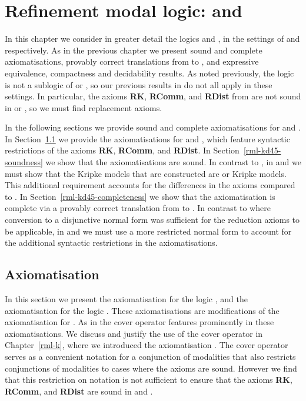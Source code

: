 \chapter{Refinement modal logic: \classKFF{} and \classKD{}}\label{rml-kd45}

In this chapter we consider in greater detail the logics \logicRmlKFF{} and \logicRmlKD{}, in the settings of \classKFF{} and \classKD{} respectively.
As in the previous chapter we present sound and complete axiomatisations, provably correct translations from \langRml{} to \langMl{}, and expressive equivalence, compactness and decidability results.
As noted previously, the logic \logicRmlK{} is not a sublogic of \logicRmlKFF{} or \logicRmlKD{}, so our previous results in \logicRmlK{} do not all apply in these settings.
In particular, the axioms {\bf RK}, {\bf RComm}, and {\bf RDist} from \axiomRmlK{} are not sound in \logicRmlKFF{} or \logicRmlKD{}, so we must find replacement axioms.

In the following sections we provide sound and complete axiomatisations for \logicRmlKFF{} and \logicRmlKD{}.
In Section~\ref{rml-kd45-axiomatisation} we provide the axiomatisations for \logicRmlKFF{} and \logicRmlKD{}, which feature syntactic restrictions of the axioms {\bf RK}, {\bf RComm}, and {\bf RDist}.
In Section~\ref{rml-kd45-soundness} we show that the axiomatisations are sound.
In contrast to \logicRmlK{}, in \logicRmlKFF{} and \logicRmlKD{} we must show that the Kripke models that are constructed are \classKFF{} or \classKD{} Kripke models.
This additional requirement accounts for the differences in the axioms compared to \logicRmlK{}.
In Section~\ref{rml-kd45-completeness} we show that the axiomatisation is complete via a provably correct translation from \langRml{} to \langMl{}.
In contrast to \logicRmlK{} where conversion to a disjunctive normal form was sufficient for the reduction axioms to be applicable, in \logicRmlKFF{} and \logicRmlKD{} we must use a more restricted normal form to account for the additional syntactic restrictions in the axiomatisations.

\section{Axiomatisation}\label{rml-kd45-axiomatisation}

In this section we present the axiomatisation \axiomRmlKFF{} for the logic \logicRmlKFF{}, and the axiomatisation \axiomRmlKD{} for the logic \logicRmlKD{}.
These axiomatisations are modifications of the axiomatisation \axiomRmlK{} for \logicRmlK{}.
As in \axiomRmlK{} the cover operator features prominently in these axiomatisations.
We discuss and justify the use of the cover operator in Chapter~\ref{rml-k}, where we introduced the axiomatisation \axiomRmlK{}.
The cover operator serves as a convenient notation for a conjunction of modalities that also restricts conjunctions of modalities to cases where the axioms are sound.
However we find that this restriction on notation is not sufficient to ensure that the axioms {\bf RK}, {\bf RComm}, and {\bf RDist} are sound in \logicRmlKFF{} and \logicRmlKD{}.

